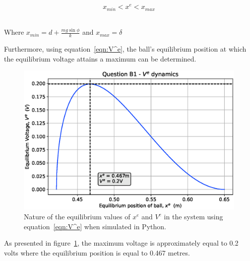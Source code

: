 \documentclass[a4paper,10pt,reqno]{amsart}
\numberwithin{equation}{section}
\begin{document}
\begin{equation}
    x_{min} < x^e < x_{max}
\end{equation}
\\
\par Where $x_{min} = d + \frac{mg\sin{\phi}}{k}$ and $x_{max} = \delta$
\\
\par Furthermore, using equation~\ref{eqn:V^e}, the ball's equilibrium position at which the equilibrium voltage attains a maximum can be determined.
\\
\begin{figure}[h]
\label{fig:B1Diagram}
 \centering
 \includegraphics[width=0.6\linewidth]{Figures/B1.eps}
 \caption{Nature of the equilibrium values of $x^e$ and $V^e$ in the system using equation~\ref{eqn:V^e} when simulated in Python.}
\end{figure}

\par As presented in figure~\ref{fig:B1Diagram}, the maximum voltage is approximately equal to 0.2 volts where the equilibrium position is equal to 0.467 metres.

\begin{lstlisting}[language=python]

\end{lstlisting}
\end{document}
